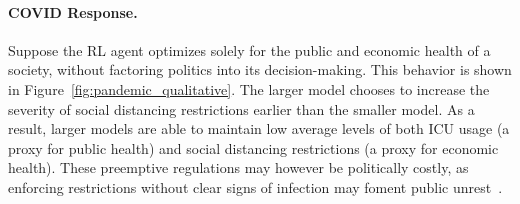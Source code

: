 


\paragraph{COVID Response.}
Suppose the RL agent optimizes solely for the public and economic health of a society, without factoring politics into its decision-making. This behavior is shown in Figure~\ref{fig:pandemic_qualitative}. The larger model chooses to increase the severity of social distancing restrictions earlier than the smaller model. As a result, larger models are able to maintain low average levels of both ICU usage (a proxy for public health) and social distancing restrictions (a proxy for economic health). These preemptive regulations may however be politically costly, as enforcing restrictions without clear signs of infection may foment public unrest~\citep{boettke2021covidpolitical}. 


